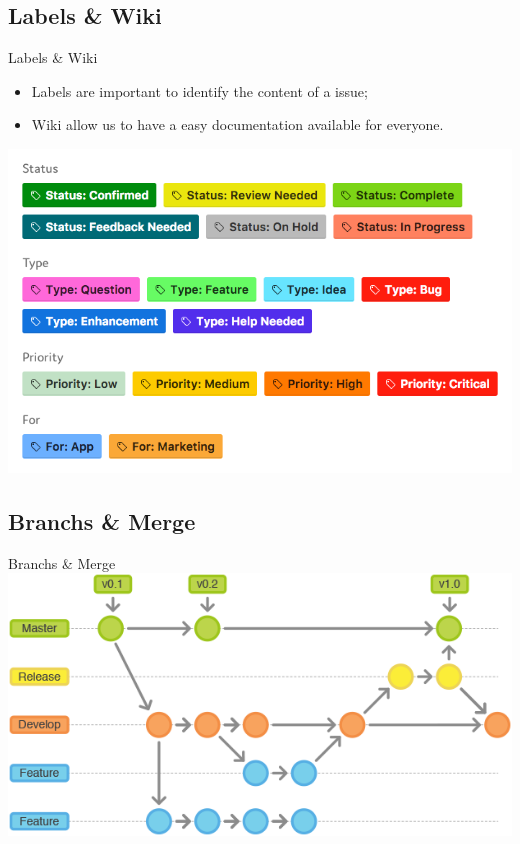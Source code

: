 \subsection{Labels \& Wiki}
\begin{frame}{Labels \& Wiki}
    \begin{itemize}
        \item Labels are important to identify the content of a issue;
        \item Wiki allow us to have a easy documentation available for everyone.
    \end{itemize}
    \centering
    \includegraphics[scale=.3]{github_labels}
\end{frame}

\subsection {Branchs \& Merge}
\begin{frame}{Branchs \& Merge}
    \centering
    \includegraphics[scale=.5]{github_branch_merge}
\end{frame}

